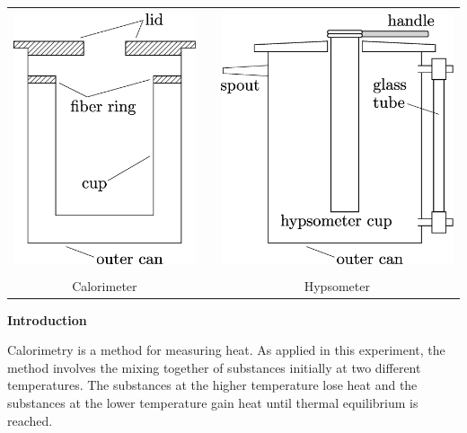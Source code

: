 \begin{center}
\begin{tabular}{ccc}
\includegraphics[height=3.0in]{calorimetry/calorimeter1.eps} & \hspace{0.6in} & \includegraphics[height=3.0in]{calorimetry/hypsometer1.eps} \\[5pt]
\LARGE Calorimeter                                           &                & \LARGE Hypsometer  \\
\end{tabular}
\end{center}

\bigskip
\textbf{Introduction} 

Calorimetry is a method for measuring heat. As applied in this experiment,
the method involves the mixing together of substances initially at
two different temperatures. The substances at the higher temperature
lose heat and the substances at the lower temperature gain heat until
thermal equilibrium is reached.


